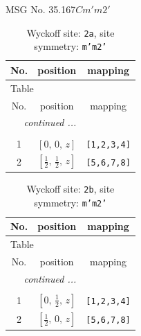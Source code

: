 \documentclass[fleqn,8pt]{jsarticle}
\begin{document}
\setcounter{MaxMatrixCols}{32}

\renewcommand{\tablename}{Table~}
\renewcommand{\figurename}{Figure~}
\begin{center}
\LARGE
MSG No. 35.167\quad$Cm'm2'$
\end{center}
\renewcommand{\arraystretch}{1.2}
\begin{longtable}{ccc}
\caption{Wyckoff site: {\tt 2a}, site symmetry: {\tt m'm2'}}
 \\
 \hline \hline
No. & position & mapping \\ \hline \endfirsthead

\multicolumn{2}{l}{\tablename\ \thetable{}} \\
 \hline \hline
No. & position & mapping \\ \hline \endhead

 \hline \hline
\multicolumn{2}{r}{\footnotesize\it continued ...} \\ \endfoot

 \hline \hline
\multicolumn{2}{r}{} \\ \endlastfoot

1 & $\left[ 0,\, 0,\, z \right]$ & {\tt [1,2,3,4]} \\ \hline
2 & $\left[ \frac{1}{2},\, \frac{1}{2},\, z \right]$ & {\tt [5,6,7,8]} \\
\end{longtable}
\renewcommand{\arraystretch}{1.2}
\begin{longtable}{ccc}
\caption{Wyckoff site: {\tt 2b}, site symmetry: {\tt m'm2'}}
 \\
 \hline \hline
No. & position & mapping \\ \hline \endfirsthead

\multicolumn{2}{l}{\tablename\ \thetable{}} \\
 \hline \hline
No. & position & mapping \\ \hline \endhead

 \hline \hline
\multicolumn{2}{r}{\footnotesize\it continued ...} \\ \endfoot

 \hline \hline
\multicolumn{2}{r}{} \\ \endlastfoot

1 & $\left[ 0,\, \frac{1}{2},\, z \right]$ & {\tt [1,2,3,4]} \\ \hline
2 & $\left[ \frac{1}{2},\, 0,\, z \right]$ & {\tt [5,6,7,8]} \\
\end{longtable}
\renewcommand{\arraystretch}{1.2}
\end{document}
